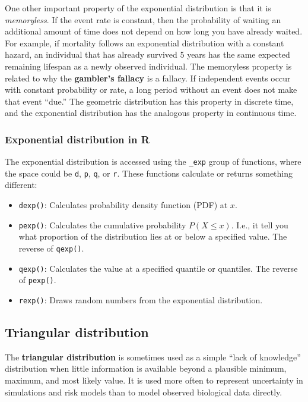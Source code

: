\documentclass[
  13,
  letterpaper,
]{report}
\providecommand{\tightlist}{%
  \setlength{\itemsep}{0pt}\setlength{\parskip}{0pt}}
\begin{document}
One other important property of the exponential distribution is that it
is \emph{memoryless}. If the event rate is constant, then the
probability of waiting an additional amount of time does not depend on
how long you have already waited. For example, if mortality follows an
exponential distribution with a constant hazard, an individual that has
already survived 5 years has the same expected remaining lifespan as a
newly observed individual. The memoryless property is related to why the
\textbf{gambler's fallacy} is a fallacy. If independent events occur
with constant probability or rate, a long period without an event does
not make that event ``due.'' The geometric distribution has this
property in discrete time, and the exponential distribution has the
analogous property in continuous time.

\subsubsection{Exponential distribution in R}\label{sec-dist-exp-r}

The exponential distribution is accessed using the \texttt{\_exp} group
of functions, where the space could be \texttt{d}, \texttt{p},
\texttt{q}, or \texttt{r}. These functions calculate or returns
something different:

\begin{itemize}
\tightlist
\item
  \texttt{dexp()}: Calculates probability density function (PDF) at
  \(x\).
\item
  \texttt{pexp()}: Calculates the cumulative probability
  \(P\left(X\leq{x}\right)\). I.e., it tell you what proportion of the
  distribution lies at or below a specified value. The reverse of
  \texttt{qexp()}.
\item
  \texttt{qexp()}: Calculates the value at a specified quantile or
  quantiles. The reverse of \texttt{pexp()}.
\item
  \texttt{rexp()}: Draws random numbers from the exponential
  distribution.
\end{itemize}

\subsection{Triangular distribution}\label{sec-dist-tri}

The \textbf{triangular distribution} is sometimes used as a simple
``lack of knowledge'' distribution when little information is available
beyond a plausible minimum, maximum, and most likely value. It is used
more often to represent uncertainty in simulations and risk models than
to model observed biological data directly.
\end{document}
